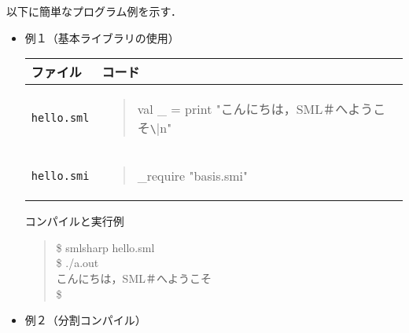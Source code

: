 \documentclass{jbook}
\newcommand{\code}[1]{\mbox{\large\tt #1}}
\newenvironment{program}{\begin{quote}\begin{tt}}%
                        {\end{tt}\end{quote}}
\begin{document}
\ifjp%
	以下に簡単なプログラム例を示す．
\begin{itemize}
\item 例１（基本ライブラリの使用）

\begin{tabular}{|l|l|}
\hline
ファイル & コード
\\\hline
\hline
\begin{minipage}{0.5\textwidth}
\code{hello.sml}
\end{minipage}
&
\begin{minipage}{0.5\textwidth}
\begin{program}
val \_ = print "こんにちは，SML＃へようこそ\verb|\|n"
\end{program}
\end{minipage}
\\\hline
\begin{minipage}{0.5\textwidth}
\code{hello.smi}
\end{minipage}
&
\begin{minipage}{0.5\textwidth}
\begin{program}
\_require "basis.smi"
\end{program}
\end{minipage}
\\\hline
\end{tabular}

コンパイルと実行例
\begin{program}
 \$ smlsharp hello.sml\\
 \$ ./a.out\\
 こんにちは，SML＃へようこそ\\
 \$
\end{program}


\item 例２（分割コンパイル）


\end{itemize}
\end{document}
